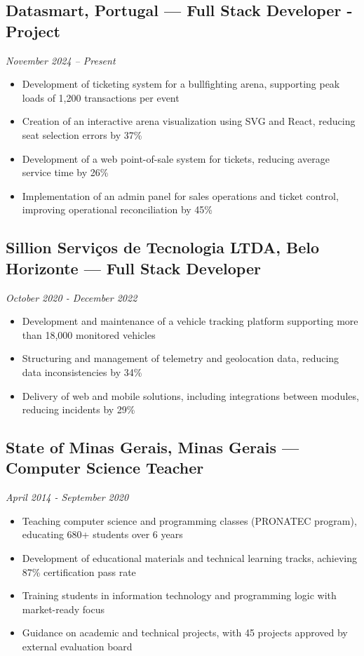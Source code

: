 \documentclass[11pt,a4paper]{article}
\newcommand{\experiencia}[4]{
    \subsection{#1, #2 — #3}
    \textit{#4}
    \vspace{4pt}
}
\begin{document}
\vspace{8pt}

\experiencia{Datasmart}{Portugal}{Full Stack Developer - Project}{November 2024 – Present}
\begin{itemize}[leftmargin=20pt, topsep=0pt, itemsep=2pt]
    \item Development of ticketing system for a bullfighting arena, supporting peak loads of 1,200 transactions per event
    \item Creation of an interactive arena visualization using SVG and React, reducing seat selection errors by 37\%
    \item Development of a web point-of-sale system for tickets, reducing average service time by 26\%
    \item Implementation of an admin panel for sales operations and ticket control, improving operational reconciliation by 45\%
\end{itemize}

\vspace{8pt}

\experiencia{Sillion Serviços de Tecnologia LTDA}{Belo Horizonte}{Full Stack Developer}{October 2020 - December 2022}
\begin{itemize}[leftmargin=20pt, topsep=0pt, itemsep=2pt]
    \item Development and maintenance of a vehicle tracking platform supporting more than 18,000 monitored vehicles
    \item Structuring and management of telemetry and geolocation data, reducing data inconsistencies by 34\%
    \item Delivery of web and mobile solutions, including integrations between modules, reducing incidents by 29\%
\end{itemize}

\vspace{8pt}

\experiencia{State of Minas Gerais}{Minas Gerais}{Computer Science Teacher}{April 2014 - September 2020}
\begin{itemize}[leftmargin=20pt, topsep=0pt, itemsep=2pt]
    \item Teaching computer science and programming classes (PRONATEC program), educating 680+ students over 6 years
    \item Development of educational materials and technical learning tracks, achieving 87\% certification pass rate
    \item Training students in information technology and programming logic with market-ready focus
    \item Guidance on academic and technical projects, with 45 projects approved by external evaluation board
\end{itemize}
\end{document}
